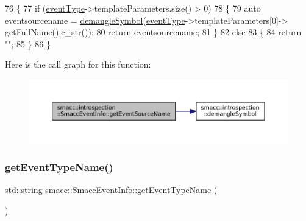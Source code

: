 \begin{DoxyCode}
76 \{
77     \textcolor{keywordflow}{if} (\hyperlink{structsmacc_1_1introspection_1_1SmaccEventInfo_af3bdf1abf797864e681662d92a5515f9}{eventType}->templateParameters.size() > 0)
78     \{
79         \textcolor{keyword}{auto} eventsourcename = \hyperlink{namespacesmacc_1_1introspection_a2f495108db3e57604d8d3ff5ef030302}{demangleSymbol}(\hyperlink{structsmacc_1_1introspection_1_1SmaccEventInfo_af3bdf1abf797864e681662d92a5515f9}{eventType}->templateParameters[0]->
      getFullName().c\_str());
80         \textcolor{keywordflow}{return} eventsourcename;
81     \}
82     \textcolor{keywordflow}{else}
83     \{
84         \textcolor{keywordflow}{return} \textcolor{stringliteral}{""};
85     \}
86 \}
\end{DoxyCode}
Here is the call graph for this function\+:
\nopagebreak
\begin{figure}[H]
\begin{center}
\leavevmode
\includegraphics[width=350pt]{structsmacc_1_1introspection_1_1SmaccEventInfo_af9e90a557f8f62069a17234f79bcefa0_cgraph}
\end{center}
\end{figure}
\mbox{\label{structsmacc_1_1introspection_1_1SmaccEventInfo_ae0ed6a9506dbe526269a0bd956a71044}} 
\subsubsection{\texorpdfstring{get\+Event\+Type\+Name()}{getEventTypeName()}}
{\footnotesize\ttfamily std\+::string smacc\+::\+Smacc\+Event\+Info\+::get\+Event\+Type\+Name (\begin{DoxyParamCaption}{ }\end{DoxyParamCaption})}



